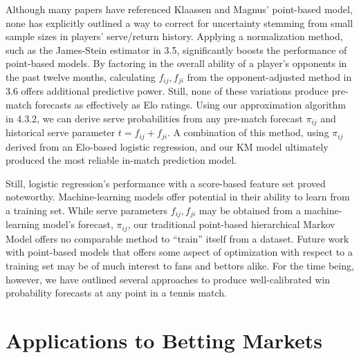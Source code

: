 \documentclass[chapterprefix=false]{report}
\begin{document}

Although many papers have referenced Klaassen and Magnus' point-based model, none has explicitly outlined a way to correct for uncertainty stemming from small sample sizes in players' serve/return history. Applying a normalization method, such as the James-Stein estimator in 3.5, significantly boosts the performance of point-based models. By factoring in the overall ability of a player's opponents in the past twelve months, calculating $f_{ij},f_{ji}$ from the opponent-adjusted method in 3.6 offers additional predictive power. Still, none of these variations produce pre-match forecasts as effectively as Elo ratings. Using our approximation algorithm in 4.3.2, we can derive serve probabilities from any pre-match forecast $\pi_{ij}$ and historical serve parameter $t = f_{ij} + f_{ji}$. A combination of this method, using $\pi_{ij}$ derived from an Elo-based logistic regression, and our KM model ultimately produced the most reliable in-match prediction model.

Still, logistic regression's performance with a score-based feature set proved noteworthy. Machine-learning models offer potential in their ability to learn from a training set. While serve parameters $f_{ij},f_{ji}$ may be obtained from a machine-learning model's forecast, $\pi_{ij}$, our traditional point-based hierarchical Markov Model offers no comparable method to ``train'' itself from a dataset. Future work with point-based models that offers some aspect of optimization with respect to a training set may be of much interest to fans and bettors alike. For the time being, however, we have outlined several approaches to produce well-calibrated win probability forecasts at any point in a tennis match.

\section{Applications to Betting Markets}
\end{document}
